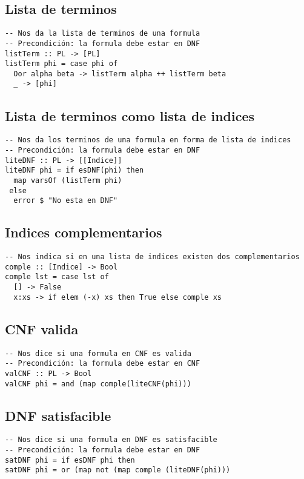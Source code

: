 \documentclass[11pt]{article}
\begin{document}
\subsection{Lista de terminos}
\label{sec:orgc9dbfb1}
\begin{verbatim}
-- Nos da la lista de terminos de una formula
-- Precondición: la formula debe estar en DNF
listTerm :: PL -> [PL]
listTerm phi = case phi of 
  Oor alpha beta -> listTerm alpha ++ listTerm beta
  _ -> [phi]
\end{verbatim}
\subsection{Lista de terminos como lista de indices}
\label{sec:org8fae79e}
\begin{verbatim}
-- Nos da los terminos de una formula en forma de lista de indices
-- Precondición: la formula debe estar en DNF
liteDNF :: PL -> [[Indice]]
liteDNF phi = if esDNF(phi) then 
  map varsOf (listTerm phi)
 else
  error $ "No esta en DNF"
\end{verbatim}
\subsection{Indices complementarios}
\label{sec:org9f30760}
\begin{verbatim}
-- Nos indica si en una lista de indices existen dos complementarios
comple :: [Indice] -> Bool
comple lst = case lst of
  [] -> False
  x:xs -> if elem (-x) xs then True else comple xs
\end{verbatim}
\subsection{CNF valida}
\label{sec:org795663c}
\begin{verbatim}
-- Nos dice si una formula en CNF es valida
-- Precondición: la formula debe estar en CNF
valCNF :: PL -> Bool
valCNF phi = and (map comple(liteCNF(phi)))
\end{verbatim}
\subsection{DNF satisfacible}
\label{sec:org7c64f2f}
\begin{verbatim}
-- Nos dice si una formula en DNF es satisfacible
-- Precondición: la formula debe estar en DNF
satDNF phi = if esDNF phi then 
satDNF phi = or (map not (map comple (liteDNF(phi)))
\end{verbatim}
\end{document}
